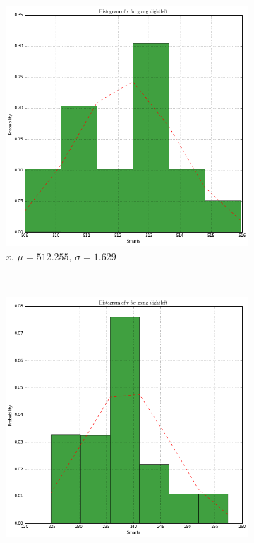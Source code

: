 \documentclass[paper=a4, fontsize=11pt]{scrartcl} %
\begin{document}
    \begin{figure}[h!]
        \centering
        \begin{subfigure}[b]{0.3\textwidth}
            \setlength{\fboxsep}{0.5pt} %
            \setlength{\fboxrule}{0.5pt}
            \includegraphics[width=\textwidth,fbox]{images/histogram_2_x_slightLeft.png}
            \caption{$x$, $\mu = 512.255$, $\sigma = 1.629$}
        \end{subfigure}
        ~
        \begin{subfigure}[b]{0.3\textwidth}
            \setlength{\fboxsep}{0.5pt} %
            \setlength{\fboxrule}{0.5pt}
            \includegraphics[width=\textwidth,fbox]{images/histogram_2_y_slightLeft.png}

\end{subfigure}
\end{figure}
\end{document}
